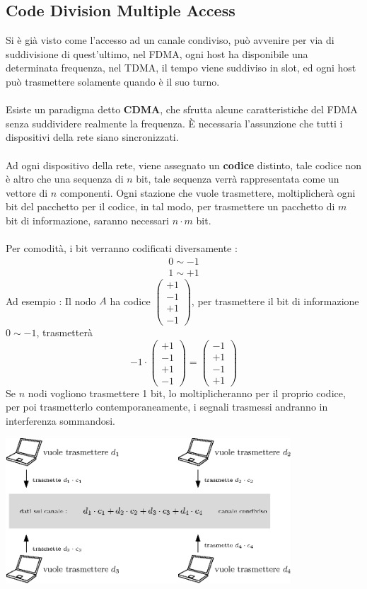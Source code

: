\documentclass[12pt, letterpaper]{article}
\newcommand{\acc}{\\\hphantom{}\\}
\begin{document}
\subsection{Code Division Multiple Access}
Si è già visto come l'accesso ad un canale condiviso, può avvenire per via di suddivisione di quest'ultimo, nel FDMA, 
ogni host ha disponibile una determinata frequenza, nel TDMA, il tempo viene suddiviso in slot, ed ogni host può trasmettere 
solamente quando è il suo turno.\acc 
Esiste un paradigma detto \textbf{CDMA}, che sfrutta alcune caratteristiche del FDMA senza suddividere realmente la frequenza.
È necessaria l'assunzione che tutti i dispositivi della rete siano sincronizzati.
\acc
Ad ogni dispositivo della rete, viene assegnato un \textbf{codice} distinto, tale codice non è altro che una 
sequenza di $n$ bit, tale sequenza verrà rappresentata come un vettore di $n$ componenti. Ogni stazione che vuole 
trasmettere, moltiplicherà ogni bit del pacchetto per il codice, in tal modo, per trasmettere un pacchetto di 
$m$ bit di informazione, saranno necessari $n\cdot m$ bit.\acc 
Per comodità, i bit verranno codificati diversamente : $$\begin{matrix} 0\sim -1 \\ 1\sim +1\end{matrix}$$
    Ad esempio : Il nodo $A$ ha codice $\begin{pmatrix}
        +1\\ -1\\ +1\\ -1
    \end{pmatrix}$, per trasmettere il bit di informazione $0\sim-1$, trasmetterà $$-1\cdot \begin{pmatrix}
        +1\\ -1\\ +1\\ -1
    \end{pmatrix} = \begin{pmatrix}
        -1\\ +1\\ -1\\ +1
    \end{pmatrix}$$
Se $n$ nodi vogliono trasmettere 1 bit, lo moltiplicheranno per il proprio codice, per poi trasmetterlo 
contemporaneamente, i segnali trasmessi andranno in interferenza sommandosi.\begin{center}
    \includegraphics[width=0.8\textwidth ]{images/CDMA.eps}
\end{center}
\end{document}
